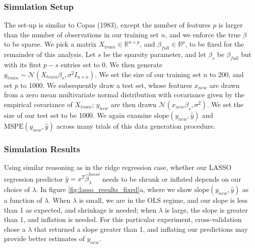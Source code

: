 \documentclass[main]{subfiles}
\begin{document}

\subsubsection{Simulation Setup}
The set-up is similar to Copas (1983), except the number of features $p$ is larger than the number of
observations in our training set $n$,
and we enforce the true $\beta$ to be sparse. We pick a matrix $X_{train} \in \mathbb{R}^{n \times p}$, and
$\beta_{full} \in \mathbb{R}^p$, to be fixed for the remainder of this analysis. Let $s$ be the sparsity parameter, and let
$\beta_s$ be $\beta_{full}$ but with its first $p - s$ entries set to 0.
We then generate $y_{train} \sim \mathcal{N}(X_{train}\beta_s, \sigma^2 I_{n\times n})$.
We set the size of our training set $n$ to 200, and set $p$ to 1000.
We subsequently draw a test set, whose features $x_{new}$ are drawn from a zero mean multivariate normal distribution with
covariance given by the empirical covariance of $X_{train}$; $y_{new}$ are then drawn $\mathcal{N}(x_{new}\beta_s, \sigma^2)$.
We set the size of our test set to be 1000. We again examine $\text{slope}(y_{new}, \hat y)$ and
$\text{MSPE}(y_{new}, \hat y)$ across many trials of this data generation procedure.


\subsubsection{Simulation Results}

Using similar reasoning as in the ridge regression case, whether our LASSO regression predictor
$\hat y = x^T \hat\beta^{lasso}_\lambda$ needs to be shrunk or inflated depends
on our choice of $\lambda$. In figure
\ref{fig:lasso_results_fixed}a, where we show $\text{slope}(y_{new}, \hat y)$ as a function of $\lambda$.
When $\lambda$ is small, we are in the OLS regime, and our slope is less than 1 as expected, and shrinkage is needed;
when $\lambda$ is large, the slope is greater than 1, and inflation is needed. For this particular experiment,
cross-validation chose a $\lambda$ that returned a slope greater than 1, and inflating our
predictions may provide better estimates of $y_{new}$.
\end{document}
